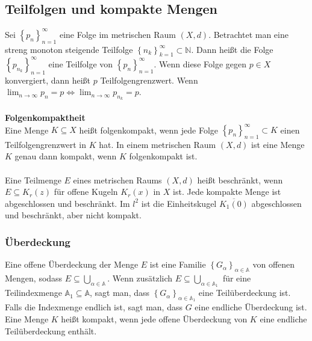 \documentclass[a4paper,12pt]{article}
\begin{document}
\subsection{Teilfolgen und kompakte Mengen}
Sei $\left\{p_n\right\}_{n=1}^\infty$ eine Folge im metrischen Raum $(X,d)$. Betrachtet man eine streng monoton steigende Teilfolge $\left\{n_k\right\}_{k=1}^\infty \subset \mathbb{N}$. Dann heißt die Folge $\left\{p_{n_k}\right\}_{n=1}^\infty$ eine Teilfolge von $\left\{p_n\right\}_{n=1}^\infty$. Wenn diese Folge gegen $p \in X$ konvergiert, dann heißt $p$ Teilfolgengrenzwert. Wenn $\lim_{n\rightarrow \infty}p_n=p\Leftrightarrow \lim_{n\rightarrow \infty}p_{n_k}=p$.
\\\hfill\\\textbf{Folgenkompaktheit}\\ 
Eine Menge $K\subseteq X$ heißt folgenkompakt, wenn jede Folge $\left\{p_n\right\}_{n=1}^\infty\subset K$ einen Teilfolgengrenzwert in $K$ hat. In einem metrischen Raum $(X,d)$ ist eine Menge $K$ genau dann kompakt, wenn $K$ folgenkompakt ist.\\\\
Eine Teilmenge $E$ eines metrischen Raums $(X,d)$ heißt beschränkt, wenn $E\subseteq K_r(z)$ für offene Kugeln $K_r(x)$ in $X$ ist. Jede kompakte Menge ist abgeschlossen und beschränkt. Im $l^2$ ist die Einheitskugel $\overline{K_1(0)}$ abgeschlossen und beschränkt, aber nicht kompakt.

\subsubsection{Überdeckung}
Eine offene Überdeckung der Menge $E$ ist eine Familie $\left\{G_\alpha \right\}_{\alpha  \in \mathbb{A}}$ von offenen Mengen, sodass $E\subseteq \bigcup_{\alpha  \in \mathbb{A}}$. Wenn zusätzlich $E\subseteq \bigcup _{\alpha  \in \mathbb{A}_1}$ für eine Teilindexmenge $\mathbb{A}_1\subseteq \mathbb{A}$, sagt man, dass $\left\{G_\alpha \right\}_{\alpha  \in \mathbb{A}_1}$ eine Teilüberdeckung ist. Falls die Indexmenge endlich ist, sagt man, dass $G$ eine endliche Überdeckung ist. Eine Menge $K$ heißt kompakt, wenn jede offene Überdeckung von $K$ eine endliche Teilüberdeckung enthält.
\end{document}
